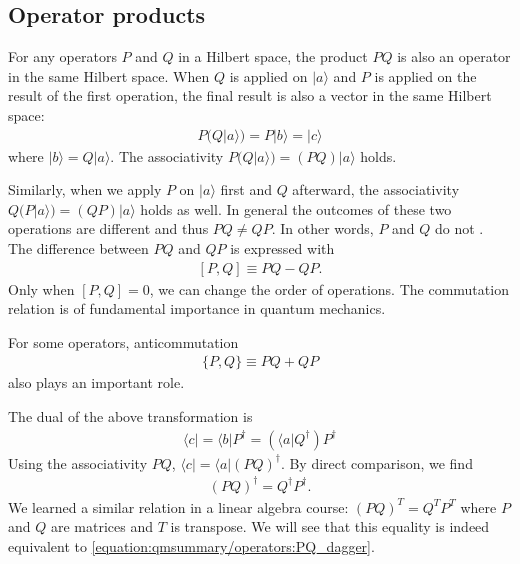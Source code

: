 \documentclass[letterpaper,10pt,english]{jupyterBook}
\begin{document}
\subsection{Operator products}
\label{\detokenize{qmsummary/operators:operator-products}}
\sphinxAtStartPar
For any operators \(P\) and \(Q\) in a Hilbert space, the product \(PQ\) is also an operator in the same Hilbert space. When \(Q\) is applied on \(|a\rangle\) and \(P\) is applied on the result of the first operation,  the final result is also a vector in the same Hilbert space:
\begin{equation*}
\begin{split}
P (Q|a\rangle) = P |b\rangle = |c\rangle
\end{split}
\end{equation*}
\sphinxAtStartPar
where \(|b\rangle = Q |a\rangle\). The associativity \(P (Q|a\rangle) = (PQ) |a\rangle\) holds.

\sphinxAtStartPar
Similarly, when we apply \(P\) on \(|a\rangle\) first and \(Q\) afterward, the associativity  \(Q (P|a\rangle) = (QP) |a\rangle\) holds as well.
In general the outcomes of these two operations are different and thus \(PQ \ne QP\).  In other words, \(P\) and \(Q\) do not .  The difference between \(PQ\) and \(QP\) is expressed with 
\begin{equation*}
\begin{split}
[P,Q] \equiv PQ - QP.
\end{split}
\end{equation*}
\sphinxAtStartPar
Only when \([P,Q]=0\), we can change the order of operations. The commutation relation is of fundamental importance in quantum mechanics.

\sphinxAtStartPar
For some operators, anti\sphinxhyphen{}commutation
\begin{equation*}
\begin{split}
\{P,Q\} \equiv PQ + QP
\end{split}
\end{equation*}
\sphinxAtStartPar
also plays an important role.

\sphinxAtStartPar
The dual of the above transformation is
\begin{equation*}
\begin{split}
\langle c| = \langle b|P^\dagger = (\langle a| Q^\dagger) P^\dagger
\end{split}
\end{equation*}
\sphinxAtStartPar
Using the associativity \(PQ\), \(\langle c| = \langle a| (PQ)^\dagger\).  By direct comparison, we find
\begin{equation}\label{equation:qmsummary/operators:PQ_dagger}
\begin{split}
(PQ)^\dagger = Q^\dagger P^\dagger.
\end{split}
\end{equation}
\sphinxAtStartPar
We learned a similar relation in a linear algebra course: \((PQ)^T=Q^T P^T\) where \(P\) and \(Q\) are matrices and \(T\) is transpose.  We will see that this equality is indeed equivalent to \eqref{equation:qmsummary/operators:PQ_dagger}.
\end{document}
